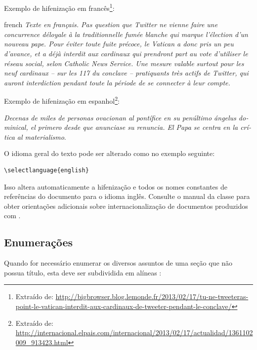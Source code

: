 Exemplo de hifenização em francês\footnote{Extraído de:
	\url{http://bigbrowser.blog.lemonde.fr/2013/02/17/tu-ne-tweeteras-point-le-vatican-interdit-aux-cardinaux-de-tweeter-pendant-le-conclave/}}:

\begin{otherlanguage*}{french}
	\textit{Texte en français. Pas question que Twitter ne vienne faire une
		concurrence déloyale à la traditionnelle fumée blanche qui marque l'élection
		d'un nouveau pape. Pour éviter toute fuite précoce, le Vatican a donc pris un
		peu d'avance, et a déjà interdit aux cardinaux qui prendront part au vote
		d'utiliser le réseau social, selon Catholic News Service. Une mesure valable
		surtout pour les neuf cardinaux – sur les 117 du conclave – pratiquants très
		actifs de Twitter, qui auront interdiction pendant toute la période de se
		connecter à leur compte.}
\end{otherlanguage*}

Exemplo de hifenização em espanhol\footnote{Extraído de:
	\url{http://internacional.elpais.com/internacional/2013/02/17/actualidad/1361102009_913423.html}}:

\foreignlanguage{spanish}{\textit{Decenas de miles de personas ovacionan al pontífice en su
		penúltimo ángelus dominical, el primero desde que anunciase su renuncia. El Papa se
		centra en la crítica al materialismo}}.

O idioma geral do texto pode ser alterado como no exemplo seguinte:

\begin{verbatim}
\selectlanguage{english}

\end{verbatim}

Isso altera automaticamente a hifenização e todos os nomes constantes de
referências do documento para o idioma inglês. Consulte o manual da classe para obter orientações adicionais sobre internacionalização de documentos produzidos com \textsf{\abnTeX} \cite{abnetxclasse}.

\subsection{Enumerações}

Quando for necessário enumerar
os diversos assuntos de uma seção que não possua título, esta deve ser
subdividida em alíneas \cite[4.2]{nbr6024}:

